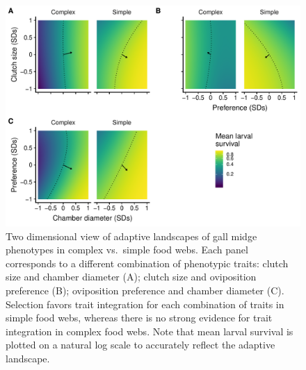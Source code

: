 \documentclass[11pt,]{article}
\begin{document}
\begin{figure}
\centering
\includegraphics{analyses/MV_landscapes.pdf}
\caption{\label{fig:MV_Landscape}Two dimensional view of adaptive
landscapes of gall midge phenotypes in complex vs.~simple food webs.
Each panel corresponds to a different combination of phenotypic traits:
clutch size and chamber diameter (A); clutch size and oviposition
preference (B); oviposition preference and chamber diameter (C).
Selection favors trait integration for each combination of traits in
simple food webs, whereas there is no strong evidence for trait
integration in complex food webs. Note that mean larval survival is
plotted on a natural log scale to accurately reflect the adaptive
landscape.}
\end{figure}
\end{document}
